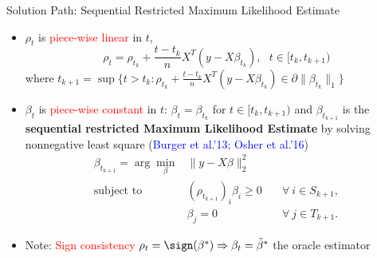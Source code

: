 \documentclass[slidestop,compress,9pt,epsfig,color]{beamer}
\theoremstyle{example}
\begin{document}
\begin{frame}{Solution Path: Sequential Restricted Maximum Likelihood Estimate}
\begin{itemize}
\item $\rho_t$ is \textcolor{red}{piece-wise linear} in $t$,
$$ \rho_t = \rho_{t_k}+\frac{t-t_k}{n}X^T(y-X\beta_{t_k}), \ \ \ t\in[t_k,t_{k+1})$$
where $t_{k+1}=\sup\{t>t_k:\rho_{t_k}+\frac{t-t_k}{n} X^T(y-X\beta_{t_k})\in \partial\|\beta_{t_k}\|_1\}$
\item $\beta_t$ is \textcolor{red}{piece-wise constant} in $t$: $\beta_t = \beta_{t_k}$ for $t\in [t_k,t_{k+1})$ and $\beta_{t_{k+1}}$ is the \textbf{sequential restricted Maximum Likelihood Estimate} by solving nonnegative least square (\textcolor{blue}{Burger et al.'13; Osher et al.'16})
\begin{equation}\label{iss-sub}
\begin{array}{rrl}
\beta_{t_{k+1}} = \arg\min_\beta &\|y-X\beta\|_2^2&\\
\mbox{subject to}~&(\rho_{t_{k+1}})_i \beta_i\ge 0&\quad\forall~i\in S_{k+1},\\
&\beta_j=0&\quad\forall~j\in T_{k+1}.
\end{array}
\end{equation}
\item Note: \textcolor{red}{Sign consistency} $\rho_t=\sign(\beta^*) \Rightarrow \beta_t = \tilde{\beta}^*$ the oracle estimator
\end{itemize}
\end{frame}
\end{document}
